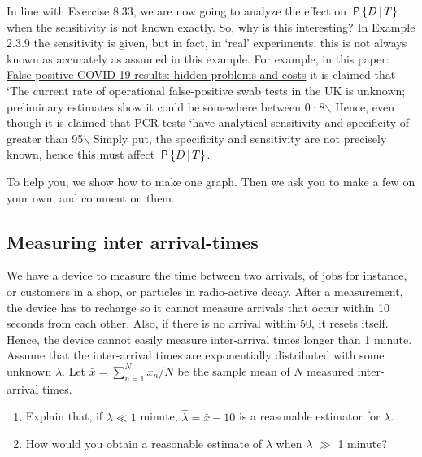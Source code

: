 \documentclass[a4paper]{article}
\begin{document}
In line with Exercise 8.33, we are now going to analyze the effect on \(\,\mathsf{P}\left\{D\,\middle|\, T\right\}\) when the sensitivity is not known exactly.
So, why is this interesting?
In Example 2.3.9 the sensitivity is given, but in fact, in `real' experiments, this is not always known as accurately as assumed in this example.
For example, in this paper: \href{https://www.thelancet.com/journals/lanres/article/PIIS2213-2600(20)30453-7/fulltext}{False-positive COVID-19 results: hidden problems and costs} it is claimed that `The current rate of operational false-positive swab tests in the UK is unknown; preliminary estimates show it could be somewhere between 0·8$\backslash$%
Hence, even though it is claimed that PCR tests `have analytical sensitivity and specificity of greater than 95$\backslash$%
Simply put, the specificity and sensitivity are not precisely known, hence this must affect \(\,\mathsf{P}\left\{D\,\middle|\, T\right\}\).

To help you, we show how to make one graph. Then we ask you to make a few on your own, and comment on them.



\subsection{Measuring inter arrival-times}
\label{sec:orgf820334}

We have a device to measure the time between two arrivals, of jobs for instance, or customers in a shop, or particles in radio-active decay.
After a measurement, the device has to recharge so it cannot measure arrivals that occur within 10 seconds from each other.
Also, if there is no arrival within 50, it resets itself.
Hence, the device cannot easily measure inter-arrival times longer than 1 minute. Assume that the inter-arrival times are exponentially distributed with some unknown \(\lambda\). Let \(\bar x = \sum_{n=1}^N x_{n} /N\) be the sample mean of \(N\) measured inter-arrival times. 

\begin{enumerate}
\item Explain that, if \(\lambda \ll 1\) minute,  \(\hat \lambda = \bar x - 10\) is a reasonable estimator for \(\lambda\).
\item How would you obtain a reasonable estimate of \(\lambda\) when \(\lambda\) \(\gg\) 1 minute?
\end{enumerate}
\end{document}

